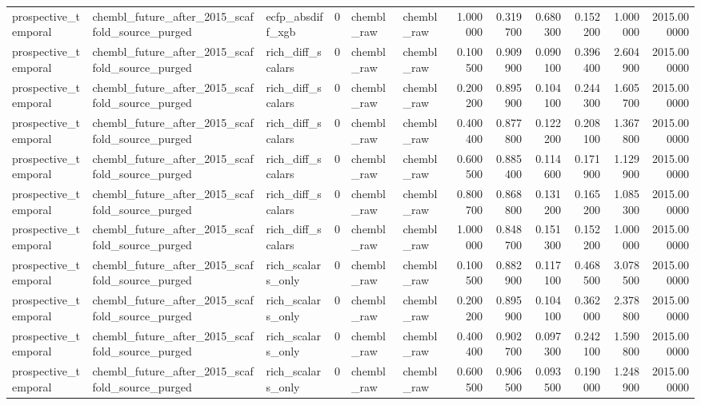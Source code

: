 \begin{longtable}{lllrllrrrrrr}
prospective\_temporal & chembl\_future\_after\_2015\_scaffold\_source\_purged & ecfp\_absdiff\_xgb & 0 & chembl\_raw & chembl\_raw & 1.000000 & 0.319700 & 0.680300 & 0.152200 & 1.000000 & 2015.000000 \\
prospective\_temporal & chembl\_future\_after\_2015\_scaffold\_source\_purged & rich\_diff\_scalars & 0 & chembl\_raw & chembl\_raw & 0.100500 & 0.909900 & 0.090100 & 0.396400 & 2.604900 & 2015.000000 \\
prospective\_temporal & chembl\_future\_after\_2015\_scaffold\_source\_purged & rich\_diff\_scalars & 0 & chembl\_raw & chembl\_raw & 0.200200 & 0.895900 & 0.104100 & 0.244300 & 1.605700 & 2015.000000 \\
prospective\_temporal & chembl\_future\_after\_2015\_scaffold\_source\_purged & rich\_diff\_scalars & 0 & chembl\_raw & chembl\_raw & 0.400400 & 0.877800 & 0.122200 & 0.208100 & 1.367800 & 2015.000000 \\
prospective\_temporal & chembl\_future\_after\_2015\_scaffold\_source\_purged & rich\_diff\_scalars & 0 & chembl\_raw & chembl\_raw & 0.600500 & 0.885400 & 0.114600 & 0.171900 & 1.129900 & 2015.000000 \\
prospective\_temporal & chembl\_future\_after\_2015\_scaffold\_source\_purged & rich\_diff\_scalars & 0 & chembl\_raw & chembl\_raw & 0.800700 & 0.868800 & 0.131200 & 0.165200 & 1.085300 & 2015.000000 \\
prospective\_temporal & chembl\_future\_after\_2015\_scaffold\_source\_purged & rich\_diff\_scalars & 0 & chembl\_raw & chembl\_raw & 1.000000 & 0.848700 & 0.151300 & 0.152200 & 1.000000 & 2015.000000 \\
prospective\_temporal & chembl\_future\_after\_2015\_scaffold\_source\_purged & rich\_scalars\_only & 0 & chembl\_raw & chembl\_raw & 0.100500 & 0.882900 & 0.117100 & 0.468500 & 3.078500 & 2015.000000 \\
prospective\_temporal & chembl\_future\_after\_2015\_scaffold\_source\_purged & rich\_scalars\_only & 0 & chembl\_raw & chembl\_raw & 0.200200 & 0.895900 & 0.104100 & 0.362000 & 2.378800 & 2015.000000 \\
prospective\_temporal & chembl\_future\_after\_2015\_scaffold\_source\_purged & rich\_scalars\_only & 0 & chembl\_raw & chembl\_raw & 0.400400 & 0.902700 & 0.097300 & 0.242100 & 1.590800 & 2015.000000 \\
prospective\_temporal & chembl\_future\_after\_2015\_scaffold\_source\_purged & rich\_scalars\_only & 0 & chembl\_raw & chembl\_raw & 0.600500 & 0.906500 & 0.093500 & 0.190000 & 1.248900 & 2015.000000 \\

\end{longtable}

